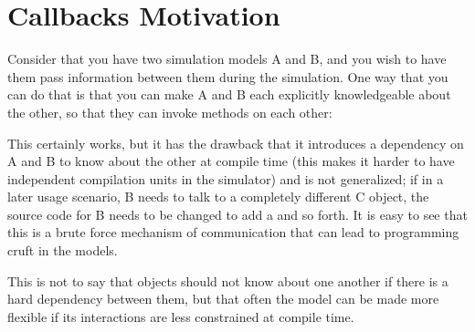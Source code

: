 \documentclass[letterpaper,10pt,english]{sphinxmanual}
\renewcommand{\sphinxcode}[1]{\texttt{\small{#1}}}
\begin{document}
\section{Callbacks Motivation}
\label{\detokenize{callbacks:callbacks-motivation}}
Consider that you have two simulation models A and B, and you wish to have them
pass information between them during the simulation. One way that you can do
that is that you can make A and B each explicitly knowledgeable about the other,
so that they can invoke methods on each other:

\begin{sphinxVerbatim}[commandchars=\\\{\}]
  
     

   

  
    

    

    
\end{sphinxVerbatim}

This certainly works, but it has the drawback that it introduces a dependency on
A and B to know about the other at compile time (this makes it harder to have
independent compilation units in the simulator) and is not generalized; if in a
later usage scenario, B needs to talk to a completely different C object, the
source code for B needs to be changed to add a \sphinxcode{} and so forth. It
is easy to see that this is a brute force mechanism of communication that can
lead to programming cruft in the models.

This is not to say that objects should not know about one another if there is a
hard dependency between them, but that often the model can be made more flexible
if its interactions are less constrained at compile time.
\end{document}
